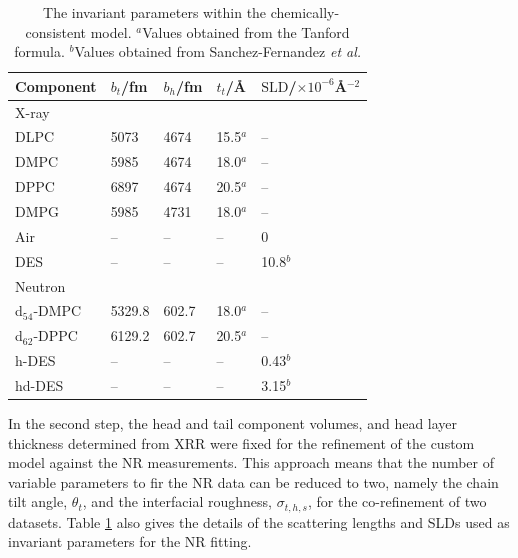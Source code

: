 \documentclass[twoside,twocolumn,9pt]{article}
\begin{document}
%
\begin{table}[h]
	\small
	\caption{\ The invariant parameters within the chemically-consistent model.
	$^a$Values obtained from the Tanford formula.\cite{Tanford1980} $^b$Values obtained from Sanchez-Fernandez \emph{et al.}\cite{Sanchez-Fernandez2016}}
	\label{tab:invariant}
	\begin{tabular*}{0.48\textwidth}{@{\extracolsep{\fill}}lllll}
		\hline
		Component & $b_t$/fm & $b_h$/fm & $t_t$/\AA & $\text{SLD}$/$\times10^{-6}$\AA$^{-2}$ \\
		\hline
		X-ray & & & & \\
		DLPC & 5073 & 4674 & 15.5$^a$ & -- \\
		DMPC & 5985 & 4674 & 18.0$^a$ & -- \\
		DPPC & 6897 & 4674 & 20.5$^a$ & -- \\
		DMPG & 5985 & 4731 & 18.0$^a$ & --\\
		Air & -- & -- & -- & 0\\
		DES & -- & -- & -- & 10.8$^b$ \\
		\hline
		Neutron & & & & \\
		d$_{54}$-DMPC & 5329.8 & 602.7 & 18.0$^a$ & -- \\
		d$_{62}$-DPPC & 6129.2 & 602.7 & 20.5$^a$ & -- \\
		h-DES & -- & -- & -- & 0.43$^b$  \\
		hd-DES & -- & -- & -- & 3.15$^b$ \\
		\hline
	\end{tabular*}
\end{table}
%
In the second step, the head and tail component volumes, and head layer thickness determined from XRR were fixed for the refinement of the custom model against the NR measurements. This approach means that the number of variable parameters to fir the NR data can be reduced to two, namely the chain tilt angle, $\theta_t$, and the interfacial roughness, $\sigma_{t,h,s}$, for the co-refinement of two datasets. Table \ref{tab:invariant} also gives the details of the scattering lengths and SLDs used as invariant parameters for the NR fitting.
\end{document}
